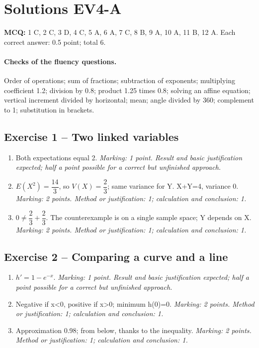 \clearpage\section*{Solutions EV4-A}\label{EV4-A-CORR}
\textbf{MCQ:} 1 C, 2 C, 3 D, 4 C, 5 A, 6 A, 7 C, 8 B, 9 A, 10 A, 11 B, 12 A. Each correct answer: 0.5 point; total 6.
\paragraph{Checks of the fluency questions.} Order of operations; sum of fractions; subtraction of exponents; multiplying coefficient 1.2; division by 0.8; product 1.25 times 0.8; solving an affine equation; vertical increment divided by horizontal; mean; angle divided by 360; complement to 1; substitution in brackets.
\subsection*{Exercise 1 -- Two linked variables}
\begin{enumerate}
\item Both expectations equal 2. \textit{Marking: 1 point. Result and basic justification expected; half a point possible for a correct but unfinished approach.}
\item $E(X^2)=\dfrac{14}{3}$, so $V(X)=\dfrac{2}{3}$; same variance for Y. X+Y=4, variance 0. \textit{Marking: 2 points. Method or justification: 1; calculation and conclusion: 1.}
\item $0\ne \dfrac{2}{3}+\dfrac{2}{3}$. The counterexample is on a single sample space; Y depends on X. \textit{Marking: 2 points. Method or justification: 1; calculation and conclusion: 1.}
\end{enumerate}
\subsection*{Exercise 2 -- Comparing a curve and a line}
\begin{enumerate}
\item $h\prime=1-e^{-x}$. \textit{Marking: 1 point. Result and basic justification expected; half a point possible for a correct but unfinished approach.}
\item Negative if x<0, positive if x>0; minimum h(0)=0. \textit{Marking: 2 points. Method or justification: 1; calculation and conclusion: 1.}
\item Approximation 0.98; from below, thanks to the inequality. \textit{Marking: 2 points. Method or justification: 1; calculation and conclusion: 1.}
\end{enumerate}
